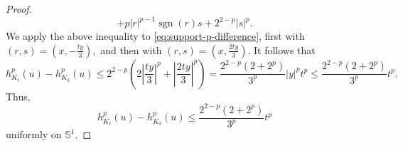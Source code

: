 \documentclass[11pt,a4paper]{amsart}
\theoremstyle{plain}
\theoremstyle{definition}
\begin{document}
\begin{proof}
$$        +p|r|^{p-1}\operatorname{sgn}(r)s+ 2^{2-p}|s|^p.
$$
We apply the above inequality to  \eqref{eq:support-p-difference}, first with
$
    (r,s)=(x,-\frac{ty}{3}),
$
and then with
    $(r,s)=(x,\frac{2ty}{3}).
$
It follows that
\[
 h_{K_t}^p(u)-h_{K_0}^p(u)\leq
    2^{2-p}\left(
        2\left|\frac{ty}{3}\right|^p
        +
        \left|\frac{2ty}{3}\right|^p
    \right)=
    \frac{2^{2-p}(2+2^p)}{3^p}|y|^pt^p\leq
    \frac{2^{2-p}(2+2^p)}{3^p}t^p.
\]
Thus,
\begin{equation}
    \label{eq:support-p-estimate}
    h_{K_t}^p(u)-h_{K_0}^p(u)
    \leq
    \frac{2^{2-p}(2+2^p)}{3^p}t^p
\end{equation}
uniformly on \(\mathbb S^1\).


\end{proof}
\end{document}
